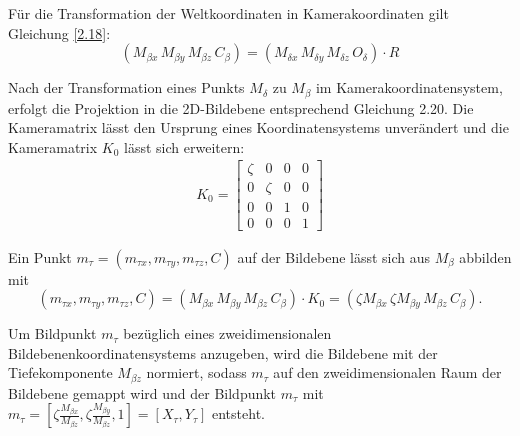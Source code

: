 Für die Transformation der Weltkoordinaten in Kamerakoordinaten gilt Gleichung \ref{2.18}:
\begin{equation}
	({M_{\beta x}}\,{M_{\beta y}}\, {M_{\beta z}}\, C_{\beta})=({M_{\delta x}}\,{M_{\delta y}}\,{M_{\delta z}}\,O_{\delta}) \cdot R
\end{equation}

Nach der Transformation eines Punkts $M_\delta$ zu $M_\beta$ im Kamerakoordinatensystem, erfolgt die Projektion in die 2D-Bildebene entsprechend Gleichung 2.20. Die Kameramatrix lässt den Ursprung eines Koordinatensystems unverändert und die Kameramatrix $K_0$ lässt sich erweitern:
\begin{gather}
	K_0 = 
	\begin{bmatrix}
		\zeta&0&0&0\\
		0&\zeta&0&0\\
		0&0&1&0\\
		0&0&0&1
	\end{bmatrix}
\end{gather}

Ein Punkt $m_\tau=(m_{\tau x},m_{\tau y},m_{\tau z},C)$ auf der Bildebene lässt sich aus $M_\beta$ abbilden mit
\begin{equation}
	(m_{\tau x},m_{\tau y},m_{\tau z},C)=({M_{\beta x}}\,{M_{\beta y }}\, {M_{\beta z}}\, C_{\beta}) \cdot K_0 = (\zeta {M_{\beta x}}\,\zeta{M_{\beta y}}\, {M_{\beta z}}\, C_{\beta}).
\end{equation}

Um Bildpunkt $m_\tau$ bezüglich eines zweidimensionalen Bildebenenkoordinatensystems anzugeben, wird die Bildebene mit der Tiefekomponente $M_{\beta z}$ normiert, sodass $m_\tau$ auf den zweidimensionalen Raum der Bildebene gemappt wird und der Bildpunkt $m_\tau$ mit $m_\tau = [\zeta \frac{M_{\beta x}}{M_{\beta z}},\zeta\frac{M_{\beta y}}{M_{\beta z}},1] = [X_\tau, Y_\tau]$ entsteht.\\

